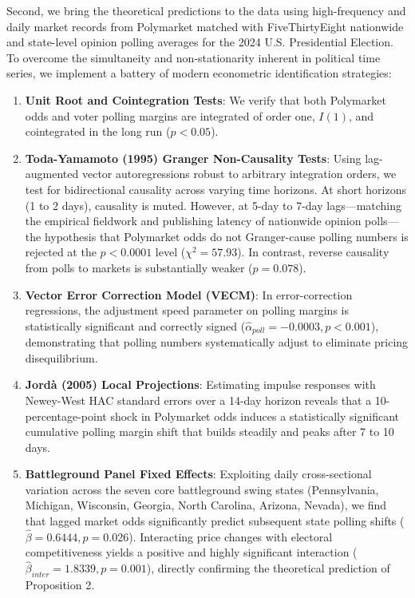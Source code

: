 \documentclass[12pt]{article}
\begin{document}
Second, we bring the theoretical predictions to the data using high-frequency and daily market records from Polymarket matched with FiveThirtyEight nationwide and state-level opinion polling averages for the 2024 U.S. Presidential Election. To overcome the simultaneity and non-stationarity inherent in political time series, we implement a battery of modern econometric identification strategies:
\begin{enumerate}
    \item \textbf{Unit Root and Cointegration Tests}: We verify that both Polymarket odds and voter polling margins are integrated of order one, $I(1)$, and cointegrated in the long run ($p < 0.05$).
    \item \textbf{Toda-Yamamoto (1995) Granger Non-Causality Tests}: Using lag-augmented vector autoregressions robust to arbitrary integration orders, we test for bidirectional causality across varying time horizons. At short horizons (1 to 2 days), causality is muted. However, at 5-day to 7-day lags—matching the empirical fieldwork and publishing latency of nationwide opinion polls—the hypothesis that Polymarket odds do not Granger-cause polling numbers is rejected at the $p < 0.0001$ level ($\chi^2 = 57.93$). In contrast, reverse causality from polls to markets is substantially weaker ($p = 0.078$).
    \item \textbf{Vector Error Correction Model (VECM)}: In error-correction regressions, the adjustment speed parameter on polling margins is statistically significant and correctly signed ($\hat{\alpha}_{poll} = -0.0003, p < 0.001$), demonstrating that polling numbers systematically adjust to eliminate pricing disequilibrium.
    \item \textbf{Jordà (2005) Local Projections}: Estimating impulse responses with Newey-West HAC standard errors over a 14-day horizon reveals that a 10-percentage-point shock in Polymarket odds induces a statistically significant cumulative polling margin shift that builds steadily and peaks after 7 to 10 days.
    \item \textbf{Battleground Panel Fixed Effects}: Exploiting daily cross-sectional variation across the seven core battleground swing states (Pennsylvania, Michigan, Wisconsin, Georgia, North Carolina, Arizona, Nevada), we find that lagged market odds significantly predict subsequent state polling shifts ($\hat{\beta} = 0.6444, p = 0.026$). Interacting price changes with electoral competitiveness yields a positive and highly significant interaction ($\hat{\beta}_{inter} = 1.8339, p = 0.001$), directly confirming the theoretical prediction of Proposition 2.
\end{enumerate}
\end{document}
